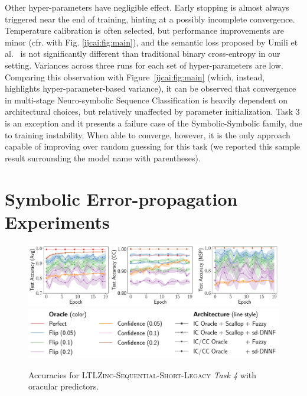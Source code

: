 %
Other hyper-parameters have negligible effect. 
Early stopping is almost always triggered near the end of training, hinting at a possibly incomplete convergence. Temperature calibration is often selected, but performance improvements are minor (cfr. with Fig. \ref{ijcai:fig:main}), and the semantic loss proposed by Umili et al.~\cite{umili2023grounding} is not significantly different than traditional binary cross-entropy in our setting.
%
Variances across three runs for each set of hyper-parameters are low. Comparing this observation with Figure~\ref{ijcai:fig:main} (which, instead, highlights hyper-parameter-based variance), it can be observed that convergence in multi-stage Neuro-symbolic Sequence Classification is heavily dependent on architectural choices, but relatively unaffected by parameter initialization.
%
Task 3 is an exception and it presents a failure case of the Symbolic-Symbolic family, due to training instability. When able to converge, however, it is the only approach capable of improving over random guessing for this task (we reported this sample result surrounding the model name with parentheses).


\section{Symbolic Error-propagation Experiments}
\begin{figure}
	\centering
	\includegraphics[width=\linewidth]{imgs/ijcai/ablation_task4.pdf}\\
	{\includegraphics[width=\linewidth]{imgs/ijcai/ablation_task4_legend.pdf}}
	\caption[Error-propagation experiments on \textsc{LTLZinc-Sequential-Short-Legacy} (Task 4)]{Accuracies for \textsc{LTLZinc-Sequential-Short-Legacy} \textit{Task 4} with oracular predictors.}
	\label{ijcai:fig:abl-task4}
\end{figure}

